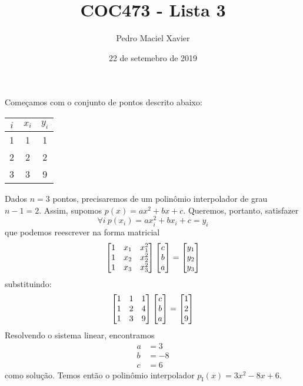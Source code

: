 \documentclass{homework}
\title{COC473 - Lista 3}
\author{Pedro Maciel Xavier}
\date{22 de setemebro de 2019}
\begin{document}
	
	\maketitle
	
	\quest%
	
	Começamos com o conjunto de pontos descrito abaixo:
	
	\begin{fig}
		\begin{tabular}{|c|c|c|}
			\hline
			$i$ & $x_i$ & $y_i$\\
			\hline
			1 & 1 & 1\\
			2 & 2 & 2\\
			3 & 3 & 9\\
			\hline
		\end{tabular}
	\end{fig}

	Dados $n = 3$ pontos, precisaremos de um polinômio interpolador de grau $n - 1 = 2$. Assim, supomos $p(x) = a x^2 + b x + c$. Queremos, portanto, satisfazer
		$$ \forall i ~ p(x_i) = a x_i^2 + b x_i + c = y_i  $$
	que podemos reescrever na forma matricial
		$$ \left[\begin{array}{@{}ccc@{}} %
		1 & x_1 & x_1^2\\
		1 & x_2 & x_2^2\\
		1 & x_3 & x_3^2\\
		\end{array}\right]%
		\left[\begin{array}{@{}c@{}} %
		c\\
		b\\
		a 
		\end{array}\right]
		=		
		\left[\begin{array}{@{}c@{}} %
		y_1\\
		y_2\\
		y_3 
		\end{array}\right]
		$$
	substituindo:
		$$ \left[\begin{array}{@{}ccc@{}} %
		1 & 1 & 1\\
		1 & 2 & 4\\
		1 & 3 & 9\\
		\end{array}\right]%
		\left[\begin{array}{@{}c@{}} %
		c\\
		b\\
		a 
		\end{array}\right]
		=		
		\left[\begin{array}{@{}c@{}} %
		1\\
		2\\
		9
		\end{array}\right]
		$$
	Resolvendo o sistema linear, encontramos
		\begin{align*}
			a &= 3\\
			b &= -8\\
			c &= 6
		\end{align*}
	como solução. Temos então o polinômio interpolador $p_\text{I}(x) = 3 x^2 - 8 x + 6$.
\end{document}
